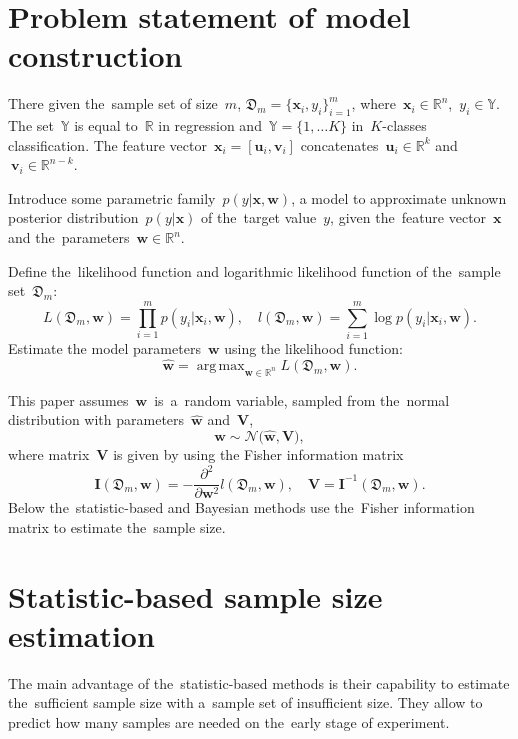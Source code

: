 \documentclass[
11pt,%
tightenlines,%
twoside,%
onecolumn,%
nofloats,%
nobibnotes,%
nofootinbib,%
superscriptaddress,%
noshowpacs,%
centertags]%
{revtex4}
\DeclareMathOperator*{\argmax}{arg\,max}
\begin{document}
\section{Problem statement of model construction}
There given the~sample set of size~$m$,
$\mathfrak{D}_{m} = \{\mathbf{x}_i, y_i\}_{i = 1}^{m}$, %
where~$\mathbf{x}_i\in \mathbb{R}^{n}$,~$y_i\in \mathbb{Y}$. The set~$\mathbb{Y}$ is equal to~$\mathbb{R}$ in regression and~$\mathbb{Y}=\{1,\dots K\}$ in~$K$-classes classification. The feature vector~$\mathbf{x}_{i} = [\mathbf{u}_{i}, \mathbf{v}_{i}]$ concatenates~$\mathbf{u}_i\in \mathbb{R}^{k}$ and~$~\mathbf{v}_i\in \mathbb{R}^{n-k}$.

Introduce some parametric family~$p(y|\mathbf{x}, \mathbf{w})$, a model to approximate unknown posterior distribution~$p(y|\mathbf{x})$ of the~target value~$y$, given the~feature vector~$\mathbf{x}$ and the~parameters~$\mathbf{w}\in \mathbb{R}^{n}$.

Define the~likelihood function and logarithmic likelihood function of the~sample set~$\mathfrak{D}_{m}$:
\[
\label{eq:ps:4}
	L\left(\mathfrak{D}_{m}, \mathbf{w}\right) = \prod_{i=1}^{m} p\left(y_{i}|\mathbf{x}_{i}, \mathbf{w}\right),\quad l\left(\mathfrak{D}_{m}, \mathbf{w}\right) = \sum_{i=1}^{m} \log p\left(y_i|\mathbf{x}_{i}, \mathbf{w}\right).
\]
Estimate the model parameters~$\mathbf{w}$ using the likelihood function:
\[
\label{eq:ps:5}
	\hat{\mathbf{w}} = \argmax_{\mathbf{w}\in\mathbb{R}^{n}}L\left(\mathfrak{D}_{m}, \mathbf{w}\right).
\]

This paper assumes~$\mathbf{w}$~is~a~random variable, sampled from the~normal distribution with parameters~$\hat{\mathbf{w}}$ and~$\mathbf{V}$,
\[
\label{eq:ps:5'}
 \mathbf{w} \sim \mathcal{N}\bigr(\hat{\mathbf{w}}, \mathbf{V}\bigr),
\]
where matrix~$\mathbf{V}$ is given by using the Fisher information matrix
\[
\label{eq:ps:6}
	\mathbf{I}\left(\mathfrak{D}_{m}, \mathbf{w}\right) = -\frac{\partial^2}{\partial \mathbf{w}^{2}}l\left(\mathfrak{D}_{m}, \mathbf{w}\right), \quad \mathbf{V} = \mathbf{I}^{-1}\left(\mathfrak{D}_{m}, \mathbf{w}\right).
\]
Below the~statistic-based and Bayesian methods use the~Fisher information matrix to estimate the~sample size.

\section{Statistic-based sample size estimation}
The main advantage of the~statistic-based methods is their capability to estimate the~sufficient sample size with a~sample set of insufficient size. They allow to predict how many samples are needed on the~early stage of experiment.
\end{document}
